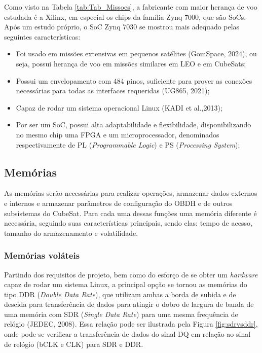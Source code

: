Como visto na Tabela \ref{tab:Tab_Missoes}, a fabricante com maior herança de voo estudada é a Xilinx, em especial os chips da família Zynq 7000, que são SoCs. Após um estudo próprio, o SoC Zynq 7030 se mostrou mais adequado pelas seguintes características:

\begin{itemize}
	\item Foi usado em missões extensivas em pequenos satélites (GomSpace, 2024), ou seja, possui herança de voo em missões similares em LEO e em CubeSats;
	\item Possui um envelopamento com 484 pinos, suficiente para prover as conexões necessárias para todas as interfaces requeridas (UG865, 2021);
	\item Capaz de rodar um sistema operacional Linux (KADI et al.,2013);
	\item Por ser um SoC, possui alta adaptabilidade e flexibilidade, disponibilizando no mesmo chip uma FPGA e um microprocessador, denominados respectivamente de PL (\textit{Programmable Logic}) e PS (\textit{Processing System});
\end{itemize}

\subsection{Memórias}

As memórias serão necessárias para realizar operações, armazenar dados externos e internos e armazenar parâmetros de configuração do OBDH e de outros subsistemas do CubeSat. Para cada uma dessas funções uma memória diferente é necessária, seguindo suas características principais, sendo elas: tempo de acesso, tamanho do armazenamento e volatilidade.

\subsubsection{Memórias voláteis}

Partindo dos requisitos de projeto, bem como do esforço de se obter um \textit{hardware} capaz de rodar um sistema Linux, a principal opção se tornou as memórias do tipo DDR (\textit{Double Data Rate}), que utilizam ambas a borda de subida e de descida para transferência de dados para atingir o dobro de largura de banda de uma memória com SDR (\textit{Single Data Rate}) para uma mesma frequência de relógio (JEDEC, 2008). Essa relação pode ser ilustrada pela Figura \ref{fig:sdrvsddr}, onde pode-se verificar a transferência de dados do sinal DQ em relação ao sinal de relógio (bCLK e CLK) para SDR e DDR.

